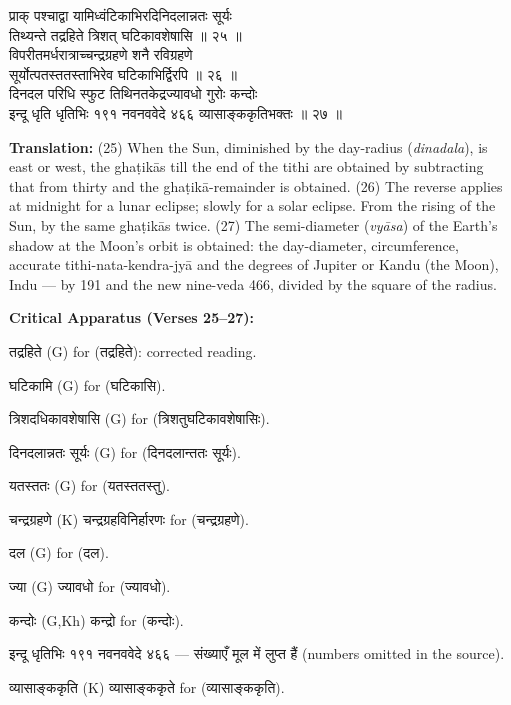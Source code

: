\documentclass[11pt,a4paper]{article}
\newcommand{\dev}[1]{{\devanagarifont #1}}
\newcommand{\sanskritcol}[1]{%
  \begin{minipage}[t]{0.47\textwidth}
  \vspace{0pt}
  \begin{flushleft}
  #1
  \end{flushleft}
  \end{minipage}%
  \hfill
}
\newcommand{\englishcol}[1]{%
  \begin{minipage}[t]{0.47\textwidth}
  \vspace{0pt}
  \begin{flushleft}
  #1
  \end{flushleft}
  \end{minipage}%
}
\newenvironment{variants}{%
  \small%
  \color{varecolor}%
  \list{}{\leftmargin=2em\itemindent=-1em}%
}{\endlist}
\begin{document}
\noindent
\sanskritcol{\dev{प्राक् पश्चाद्वा यामिध्वंटिकाभिरदिनिदलान्नतः सूर्यः} \\ \dev{तिथ्यन्ते तद्रहिते त्रिशत् घटिकावशेषासि ॥ २५ ॥} \\[0.2cm]
\dev{विपरीतमर्धरात्राच्चन्द्रग्रहणे शनै रविग्रहणे} \\ \dev{सूर्योत्पतस्ततस्ताभिरेव घटिकाभिर्द्विरपि ॥ २६ ॥} \\[0.2cm]
\dev{दिनदल परिधि स्फुट तिथिनतकेद्रज्यावधो गुरोः कन्दोः} \\ \dev{इन्दू धृति धृतिभिः १९१ नवनववेदे ४६६ व्यासाङ्ककृतिभक्तः ॥ २७ ॥}}
\englishcol{\textbf{Translation:} (25) When the Sun, diminished by the day-radius (\textit{dinadala}),
is east or west, the ghaṭikās till the end of the tithi are obtained by subtracting
that from thirty and the ghaṭikā-remainder is obtained. (26) The reverse applies at
midnight for a lunar eclipse; slowly for a solar eclipse. From the rising of the
Sun, by the same ghaṭikās twice. (27) The semi-diameter (\textit{vyāsa}) of the
Earth's shadow at the Moon's orbit is obtained: the day-diameter, circumference,
accurate tithi-nata-kendra-jyā and the degrees of Jupiter or Kandu (the Moon),
Indu --- by 191 and the new nine-veda 466, divided by the square of the radius.}

\vspace{0.4cm}
\textcolor{varecolor}{\textbf{Critical Apparatus (Verses 25--27):}}
\begin{variants}
\item[25.] \dev{तद्रहिते} (G) \dev{for} (\dev{तद्रहिते}): corrected reading.
\item[25.1] \dev{घटिकामि} (G) \dev{for} (\dev{घटिकासि}).
\item[25.2] \dev{त्रिशदधिकावशेषासि} (G) \dev{for} (\dev{त्रिशतुघटिकावशेषासिः}).
\item[25.3] \dev{दिनदलान्नतः सूर्यः} (G) \dev{for} (\dev{दिनदलान्ततः सूर्यः}).
\item[26.1] \dev{यतस्ततः} (G) \dev{for} (\dev{यतस्ततस्तु}).
\item[26.2] \dev{चन्द्रग्रहणे} (K) \dev{चन्द्रग्रहविनिर्हारणः} \dev{for} (\dev{चन्द्रग्रहणे}).
\item[27.1] \dev{दल} (G) \dev{for} (\dev{दल}).
\item[27.2] \dev{ज्या} (G) \dev{ज्यावधो} \dev{for} (\dev{ज्यावधो}).
\item[27.3] \dev{कन्दोः} (G,Kh) \dev{कन्द्रो} \dev{for} (\dev{कन्दोः}).
\item[27.4] \dev{इन्दू धृतिभिः १९१ नवनववेदे ४६६} --- \dev{संख्याएँ मूल में लुप्त हैं} (numbers omitted in the source).
\item[27.5] \dev{व्यासाङ्ककृति} (K) \dev{व्यासाङ्ककृते} \dev{for} (\dev{व्यासाङ्ककृति}).
\end{variants}
\end{document}
